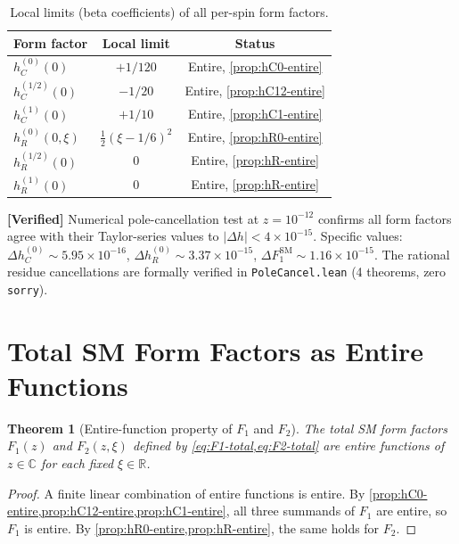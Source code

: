 \documentclass[11pt,a4paper]{article}
\theoremstyle{plain}
\newtheorem{theorem}{Theorem}[section]
\theoremstyle{definition}
\newcommand{\verified}[1]{%
  \par\smallskip\noindent
  \colorbox{green!10}{\parbox{\dimexpr\linewidth-2\fboxsep}{%
    \textcolor{green!50!black}{\textbf{[Verified]}} #1}}%
  \par\smallskip}
\begin{document}
\begin{table}[ht]
\centering
\caption{Local limits (beta coefficients) of all per-spin form factors.}
\label{tab:beta}
\begin{tabular}{lcc}
\toprule
Form factor & Local limit & Status \\
\midrule
$h_C^{(0)}(0)$ & $+1/120$ & Entire, \cref{prop:hC0-entire} \\
$h_C^{(1/2)}(0)$ & $-1/20$ & Entire, \cref{prop:hC12-entire} \\
$h_C^{(1)}(0)$ & $+1/10$ & Entire, \cref{prop:hC1-entire} \\
$h_R^{(0)}(0,\xi)$ & $\frac{1}{2}(\xi-1/6)^2$ & Entire, \cref{prop:hR0-entire} \\
$h_R^{(1/2)}(0)$ & $0$ & Entire, \cref{prop:hR-entire} \\
$h_R^{(1)}(0)$ & $0$ & Entire, \cref{prop:hR-entire} \\
\bottomrule
\end{tabular}
\end{table}

\verified{Numerical pole-cancellation test at $z = 10^{-12}$ confirms all
form factors agree with their Taylor-series values to
$|\Delta h| < 4 \times 10^{-15}$. Specific values:
$\Delta h_C^{(0)} \sim 5.95 \times 10^{-16}$,
$\Delta h_R^{(0)} \sim 3.37 \times 10^{-15}$,
$\Delta F_1^{\mathrm{SM}} \sim 1.16 \times 10^{-15}$.
The rational residue cancellations are formally verified
in \texttt{PoleCancel.lean} (4 theorems, zero \texttt{sorry}).}

\section{Total SM Form Factors as Entire Functions}\label{sec:total}

\begin{theorem}[Entire-function property of $F_1$ and $F_2$]
\label{thm:Fi-entire}
The total SM form factors $F_1(z)$ and $F_2(z,\xi)$ defined by
\cref{eq:F1-total,eq:F2-total} are entire functions of
$z \in \mathbb{C}$ for each fixed $\xi \in \mathbb{R}$.
\end{theorem}

\begin{proof}
A finite linear combination of entire functions is entire.
By \cref{prop:hC0-entire,prop:hC12-entire,prop:hC1-entire},
all three summands of $F_1$ are entire, so $F_1$ is entire.
By \cref{prop:hR0-entire,prop:hR-entire}, the same holds for $F_2$.
\end{proof}
\end{document}
